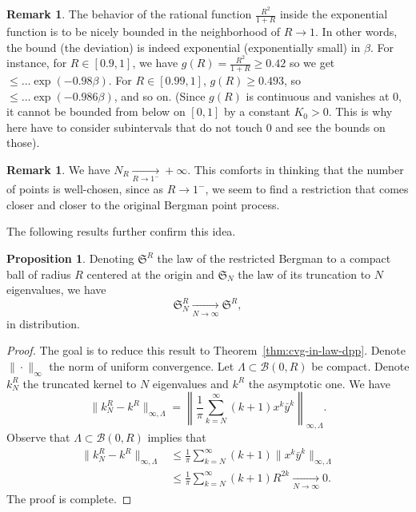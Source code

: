\documentclass[11pt]{article}
\theoremstyle{plain}
\theoremstyle{definition}
\newtheorem{proposition}[definition]{Proposition}
\newtheorem{remark}[definition]{Remark}
\begin{document}
\begin{remark} The behavior of the rational function $\frac{R^2}{1+R}$ inside the exponential function is to be nicely bounded in the neighborhood of $R \to 1$. In other words, the bound (the deviation) is indeed exponential (exponentially small) in $\beta$. For instance, for $R \in [0.9, 1]$, we have $g(R) = \frac{R^2}{1+R} \ge 0.42$ so we get $\leqslant \dots \exp(-0.98\beta)$. For $R \in [0.99, 1]$, $g(R) \ge 0.493$, so $\leqslant \dots \exp(-0.986\beta)$, and so on. (Since $g(R)$ is continuous and vanishes at 0, it cannot be bounded from below on $[0,1]$ by a constant $K_0 > 0$. This is why here have to consider subintervals that do not touch 0 and see the bounds on those).
\end{remark}

\begin{remark} We have $N_R \xrightarrow[R \to 1^-]{} +\infty$. This comforts in thinking that the number of points is well-chosen, since as $R \to 1^-$, we seem to find a restriction that comes closer and closer to the original Bergman point process.
\end{remark}

The following results further confirm this idea.

\begin{proposition} Denoting $\mathfrak{S}^R$ the law of the restricted Bergman to a compact ball of radius $R$ centered at the origin and $\mathfrak{S}_N$ the law of its truncation to $N$ eigenvalues, we have
\[
\mathfrak{S}_N^R \xrightarrow[N \to \infty]{} \mathfrak{S}^R,
\]
in distribution.
\end{proposition}

\begin{proof}

The goal is to reduce this result to Theorem~\ref{thm:cvg-in-law-dpp}. Denote $\|\cdot\|_\infty$ the norm of uniform convergence. Let $\Lambda \subset \mathcal{B}(0,R)$ be compact. Denote $k_N^R$ the truncated kernel to $N$ eigenvalues and $k^R$ the asymptotic one. We have
\[
\|k_N^R - k^R\|_{\infty, \Lambda} = \left\| \frac{1}{\pi} \sum_{k=N}^\infty (k+1) x^k \bar{y}^k \right\|_{\infty, \Lambda}.
\]
Observe that $\Lambda \subset \mathcal{B}(0,R)$ implies that
\begin{align*}
\|k_{N}^R - k^R\|_{\infty, \Lambda} &\leqslant \frac{1}{\pi} \sum_{k=N}^\infty (k+1) \|x^k \bar{y}^k\|_{\infty, \Lambda} \\
&\leqslant \frac{1}{\pi} \sum_{k=N}^\infty (k+1) R^{2k} \xrightarrow[N \to \infty]{} 0.
\end{align*}
The proof is complete.
\end{proof}
\end{document}
